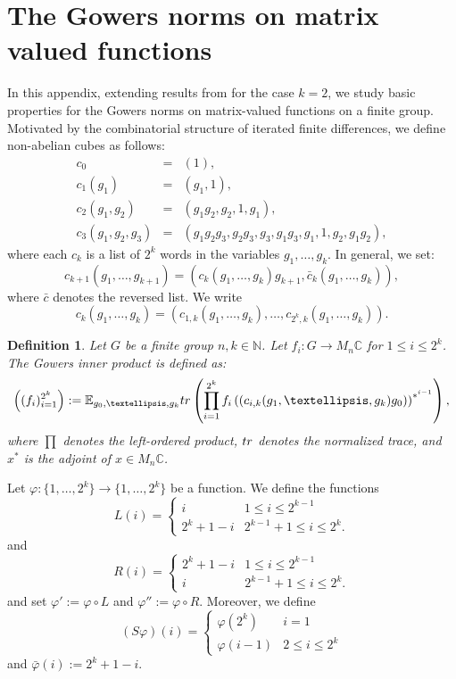 \documentclass[a4paper,11pt]{amsproc}
\theoremstyle{plain}
\newtheorem{definition}[theorem]{Definition}
\theoremstyle{definition}
\begin{document}
\section{The Gowers norms on matrix valued functions}
\label{app:gowers}
In this appendix, extending results from \cite{MR3733361} for the case $k=2$, we study basic properties for the Gowers norms on matrix-valued functions on a finite group.  Motivated by the combinatorial structure of iterated finite differences, we define non-abelian cubes as follows:
\begin{eqnarray*}
c_0&=&(1),\\
c_1(g_1)&=&(g_1,1),\\
c_2(g_1,g_2)&=&(g_1g_2,g_2,1,g_1),\\
c_3(g_1,g_2,g_3)&=&(g_1g_2g_3,g_2g_3,g_3,g_1g_3,g_1,1,g_2,g_1g_2),
\end{eqnarray*}
where each $c_k$ is a list of $2^{k}$ words in the variables $g_1,\dots,g_k$.
In general, we set:
$$c_{k+1}(g_1,\dots,g_{k+1}) = (c_k(g_1,\dots,g_k)g_{k+1},\bar c_k(g_1,\dots,g_k)),$$
where $\bar c$ denotes the reversed list. We write $$c_k(g_1,\dots,g_k)=(c_{1,k}(g_1,\dots,g_k),\dots,c_{2^k,k}(g_1,\dots,g_k)).$$
\begin{definition}
Let $G$ be a finite group $n,k \in \mathbb N$. Let $f_i \colon G \to M_n \mathbb C$ for $1 \leq i \leq 2^k$. The Gowers inner product is defined as:
$$\left((f_i)_{i=1}^{2^k} \right):= \mathbb E_{g_0,\dots, g_k} {\rm tr} \left(\prod_{i=1}^{2^k} f_i\left((c_{i,k}(g_1,\dots, g_k) g_0)\right)^{*^{i-1}} \right),$$
where $\prod$ denotes the left-ordered product, ${\rm tr}$ denotes the normalized trace, and $x^*$ is the adjoint of $x \in M_n \mathbb C$.
\end{definition} 

Let $\varphi \colon \{1,\dots,2^k\} \to \{1,\dots,2^k\}$ be a function. We define the functions
$$L(i) =\begin{cases} i & 1 \leq i \leq 2^{k-1} \\ 2^k+1-i & 2^{k-1}+1 \leq i \leq 2^k.\end{cases}$$ and $$R(i) =\begin{cases} 2^k+1-i & 1 \leq i \leq 2^{k-1} \\ i & 2^{k-1}+1 \leq i \leq 2^k.\end{cases}$$
and set $\varphi':= \varphi \circ L$ and $\varphi'' := \varphi \circ R.$
Moreover, we define 
$$(S\varphi)(i) = \begin{cases}
\varphi(2^k) & i=1 \\
\varphi(i-1) & 2 \leq i \leq 2^{k} \end{cases}$$
and $\bar \varphi(i) := 2^k +1 -i.$
\end{document}
